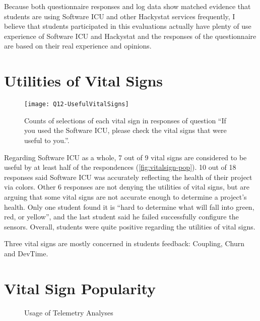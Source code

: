 Because both questionnaire responses and log data show matched evidence that students are using Software ICU and other Hackystat services frequently, I believe that students participated in this evaluations actually have plenty of use experience of Software ICU and Hackystat and the responses of the questionnaire are based on their real experience and opinions. 

\section{Utilities of Vital Signs}

\begin{figure}[htbp] %
   \centering
   \texttt{[image: Q12-UsefulVitalSigns]} 
   \caption{Counts of selections of each vital sign in responses of question ``If you used the Software ICU, please check the vital signs that were useful to you.''.}
   \label{fig:vitalsign-pop}
\end{figure}

Regarding Software ICU as a whole, 7 out of 9 vital signs are considered to be useful by at least half of the respondences (\autoref{fig:vitalsign-pop}). 10 out of 18 responses said Software ICU was accurately reflecting the health of their project via colors. Other 6 responses are not denying the utilities of vital signs, but are arguing that some vital signs are not accurate enough to determine a project's health. Only one student found it is ``hard to determine what will fall into green, red, or yellow'', and the last student said he failed successfully configure the sensors. Overall, students were quite positive regarding the utilities of vital signs.

Three vital signs are mostly concerned in students feedback: Coupling, Churn and DevTime.

\section {Vital Sign Popularity}

\begin{figure}[htbp] %
   \centering     
   \vspace{.3in}
   \caption{Usage of Telemetry Analyses}
   \label{fig:analysis-pop}
\end{figure}

